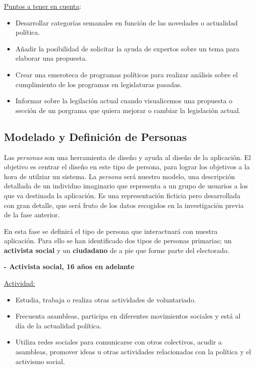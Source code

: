 \underline{Puntos a tener en cuenta}:

\begin{itemize}
  \item Desarrollar categorías semanales en función de las novedades o actualidad política.
  \item Añadir la posibilidad de solicitar la ayuda de expertos sobre un tema para elaborar una propuesta.
  \item Crear una emeroteca de programas políticos para realizar análisis sobre el cumplimiento de los programas en legislaturas pasadas.
  \item Informar sobre la legilación actual cuando visualicemos una propuesta o sección de un porgrama que quiera mejorar o cambiar la legislación actual.
\end{itemize}

\subsection{Modelado y Definición de Personas} \label{ssec:persons}

Las \textit{personas} son una herramienta de diseño y ayuda al diseño de la aplicación. El objetivo es centrar el diseño en este tipo de persona, para lograr los objetivos a la hora de utilziar un sistema. La \textit{persona} será nuestro modelo, una descripción detallada de un individuo imaginario que representa a un grupo de usuarios a los que va destinada la aplicación. Es una representación ficticia pero desarrollada con gran detalle, que será fruto de los datos recogidos en la investigación previa de la fase anterior.

En esta fase se definirá el tipo de persona que interactuará con nuestra aplicación. Para ello se han identificado dos tipos de personas primarias; un \textbf{activista social} y un \textbf{ciudadano} de a pie que forme parte del electorado.

\textbf{- Activista social, 16 años en adelante}

\underline{Actividad:}

\begin{itemize}
\item Estudia, trabaja o realiza otras actividades de voluntariado.
\item Frecuenta asambleas, participa en diferentes movimientos sociales y está al día de la actualidad política.
\item Utiliza redes sociales para comunicarse con otros colectivos, acudir a asambleas, promover ideas u otras actividades relacionadas con la política y el activismo social.
\end{itemize}

